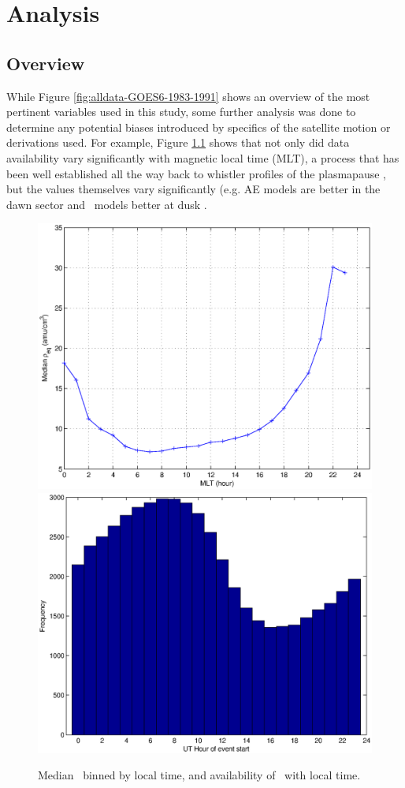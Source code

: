 \chapter[Analysis]{Analysis}

\section{Overview}
While Figure \ref{fig:alldata-GOES6-1983-1991} shows an overview of the most pertinent variables used in this study, some further analysis was done to determine any potential biases introduced by specifics of the satellite motion or derivations used. For example, Figure \ref{fig:ByHourExample} shows that not only did data availability vary significantly with magnetic local time (MLT), a process that has been well established all the way back to whistler profiles of the plasmapause \citep{Carpenter1966WhistlerStudiesPlasmapause}, but the values themselves vary significantly (e.g. AE models are better in the dawn sector and \dst\ models better at dusk \citep{OBrien2003EmpiricalPlasmapause}. 

\begin{figure}[htp!]
\centering
\includegraphics[width=0.7\linewidth]{Figures/rhoMLT.eps}
\includegraphics[width=0.7\linewidth]{Figures/nansbyhour.eps}
\caption{Median \req\ binned by local time, and availability of \req\ with local time.}
\label{fig:ByHourExample}
\end{figure}


